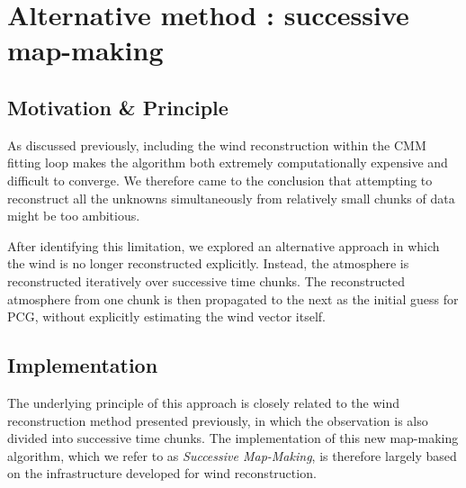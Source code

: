 \documentclass[../../thesis.tex]{subfiles}
\begin{document}



\section{Alternative method : successive map-making} \label{section:atm_successive_MM}

\subsection{Motivation \& Principle}

As discussed previously, including the wind reconstruction within the CMM fitting loop makes the algorithm both extremely computationally expensive and difficult to converge. We therefore came to the conclusion that attempting to reconstruct all the unknowns simultaneously from relatively small chunks of data might be too ambitious.

After identifying this limitation, we explored an alternative approach in which the wind is no longer reconstructed explicitly. Instead, the atmosphere is reconstructed iteratively over successive time chunks. The reconstructed atmosphere from one chunk is then propagated to the next as the initial guess for PCG, without explicitly estimating the wind vector itself.

\subsection{Implementation}

The underlying principle of this approach is closely related to the wind reconstruction method presented previously, in which the observation is also divided into successive time chunks. The implementation of this new map-making algorithm, which we refer to as \emph{Successive Map-Making}, is therefore largely based on the infrastructure developed for wind reconstruction.
\end{document}
